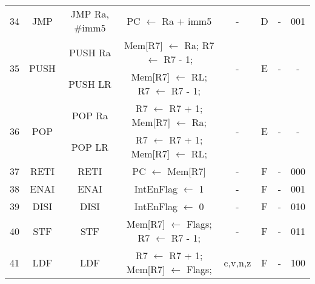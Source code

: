 \begin{table}[t]
{\begin{tabular}{r|c|c|c|c|c|c|c|}
	34& JMP   & JMP Ra, \#imm5      & PC $\leftarrow$ Ra + imm5     & -       & D & -     & 001 \\
	\multirow{2}{*}{35}& \multirow{2}{*}{PUSH}  & PUSH Ra             & Mem[R7] $\leftarrow$ Ra; R7 $\leftarrow$ R7 - 1;& \multirow{2}{*}{-} & \multirow{2}{*}{E} & \multirow{2}{*}{-} & \multirow{2}{*}{-} \\
	  &       & PUSH LR             & Mem[R7] $\leftarrow$ RL; R7 $\leftarrow$ R7 - 1;&   &   &   &   \\
	\multirow{2}{*}{36}& \multirow{2}{*}{POP}   & POP Ra              & R7 $\leftarrow$ R7 + 1; Mem[R7] $\leftarrow$ Ra;& \multirow{2}{*}{-} & \multirow{2}{*}{E} & \multirow{2}{*}{-} & \multirow{2}{*}{-} \\
	  &       & POP LR              & R7 $\leftarrow$ R7 + 1; Mem[R7] $\leftarrow$ RL;&   &   &   &   \\
	37& RETI  & RETI                & PC $\leftarrow$ Mem[R7]       & -       & F & -     & 000 \\
	38& ENAI  & ENAI                & IntEnFlag $\leftarrow$ 1      & -       & F & -     & 001 \\
	39& DISI  & DISI                & IntEnFlag $\leftarrow$ 0      & -       & F & -     & 010 \\
	40& STF   & STF                 & Mem[R7] $\leftarrow$ Flags; R7 $\leftarrow$ R7 - 1; & - & F & - & 011 \\
	41& LDF   & LDF                 & R7 $\leftarrow$ R7 + 1; Mem[R7] $\leftarrow$ Flags; & c,v,n,z & F & - & 100 \\
	\cline{2-8}
\end{tabular}
}
\end{table}